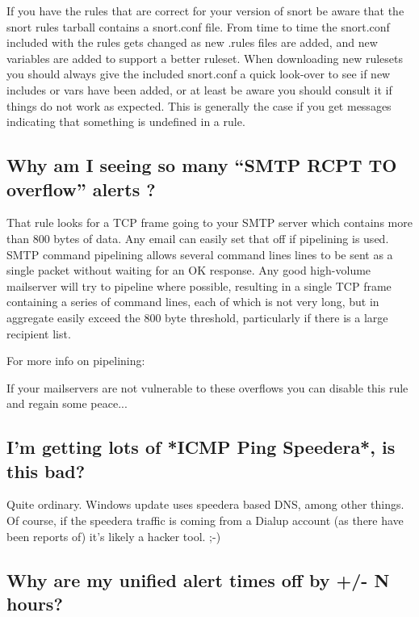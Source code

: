 \documentclass{article}
\begin{document}
If you have the rules that are correct for your version of snort be aware that
the snort rules tarball contains a snort.conf file. From time to time the
snort.conf included with the rules gets changed as new .rules files are added,
and new variables are added to support a better ruleset. When downloading new
rulesets you should always give the included snort.conf a quick look-over to
see if new includes or vars have been added, or at least be aware you should
consult it if things do not work as expected. This is generally the case if you
get messages indicating that something is undefined in a rule.

\subsection{Why am I seeing so many ``SMTP RCPT TO overflow'' alerts ?}

That rule looks for a TCP frame going to your SMTP server which contains more
than 800 bytes of data. Any email can easily set that off if pipelining is
used. SMTP command pipelining allows several command lines lines to be sent as
a single packet without waiting for an OK response. Any good high-volume
mailserver will try to pipeline where possible, resulting in a single TCP frame
containing a series of command lines, each of which is not very long, but in
aggregate easily exceed the 800 byte threshold, particularly if there is a
large recipient list.

For more info on pipelining:


If your mailservers are not vulnerable to these overflows you can disable this
rule and regain some peace...

\subsection{I'm getting lots of *ICMP Ping Speedera*, is this bad?}

Quite ordinary. Windows update uses speedera based DNS, among other things. Of
course, if the speedera traffic is coming from a Dialup account (as there have
been reports of) it's likely a hacker tool. ;-)

\subsection{Why are my unified alert times off by +/- N hours?}
\end{document}

